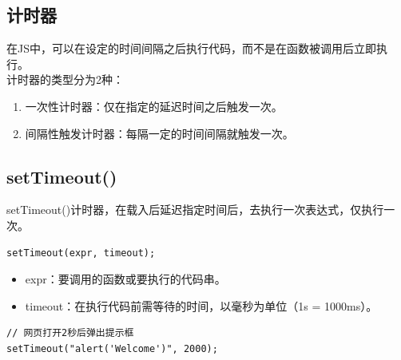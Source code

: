 \subsection{计时器}

在JS中，可以在设定的时间间隔之后执行代码，而不是在函数被调用后立即执行。 \\

计时器的类型分为2种：

\begin{enumerate}
	\item 一次性计时器：仅在指定的延迟时间之后触发一次。
	\item 间隔性触发计时器：每隔一定的时间间隔就触发一次。
\end{enumerate}

\begin{table}[H]
	\centering
	\caption{计时器方法}
\end{table}

\subsection{setTimeout()}

setTimeout()计时器，在载入后延迟指定时间后，去执行一次表达式，仅执行一次。 \\

\begin{lstlisting}[style=htmlcssjs]
setTimeout(expr, timeout);
\end{lstlisting}

\begin{itemize}
	\item expr：要调用的函数或要执行的代码串。
	\item timeout：在执行代码前需等待的时间，以毫秒为单位（1s = 1000ms）。
\end{itemize}

\begin{lstlisting}[style=htmlcssjs]
// 网页打开2秒后弹出提示框
setTimeout("alert('Welcome')", 2000);
\end{lstlisting}

